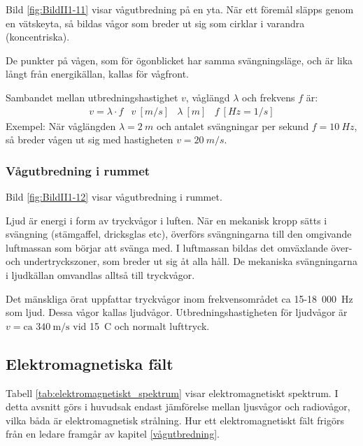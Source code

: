 Bild \ref{fig:BildII1-11} visar vågutbredning på en yta.
När ett föremål släpps genom en vätskeyta, så bildas vågor som breder ut sig
som cirklar i varandra (koncentriska).

De punkter på vågen, som för ögonblicket har samma svängningsläge, och är lika
långt från energikällan, kallas för vågfront.

Sambandet mellan utbredningshastighet \(v\), våglängd \(\lambda\) och frekvens
\(f\) är:
\[
\begin{array}{llll}
v = \lambda \cdot f & v \ [m/s] & \lambda \ [m] & f \ [Hz=1/s]
\end{array}
\]
Exempel: När våglängden \(\lambda = 2\ m\) och antalet svängningar per sekund
\(f = 10\ Hz\), så breder vågen ut sig med hastigheten \(v = 20\ m/s\).


\subsubsection{Vågutbredning i rummet}

Bild \ref{fig:BildII1-12} visar vågutbredning i rummet.

Ljud är energi i form av tryckvågor i luften.
När en mekanisk kropp sätts i svängning (stämgaffel, dricksglas etc), överförs
svängningarna till den omgivande luftmassan som börjar att svänga med.
I luftmassan bildas det omväxlande över- och undertryckszoner, som breder ut
sig åt alla håll.
De mekaniska svängningarna i ljudkällan omvandlas alltså till tryckvågor.

Det mänskliga örat uppfattar tryckvågor inom frekvensområdet ca
15-18~000~Hz som ljud.
Dessa vågor kallas ljudvågor.
Utbredningshastigheten för ljudvågor är \(v = \text{ca } 340\ \text{m/s}\) vid
15~\degree C och normalt lufttryck.

\subsection{Elektromagnetiska fält}

Tabell \ref{tab:elektromagnetiskt_spektrum} visar elektromagnetiskt spektrum.
I detta avsnitt görs i huvudsak endast jämförelse mellan ljusvågor och
radiovågor, vilka båda är elektromagnetisk strålning.
Hur ett elektromagnetiskt fält frigörs från en ledare framgår av kapitel
\ref{vågutbredning}.

